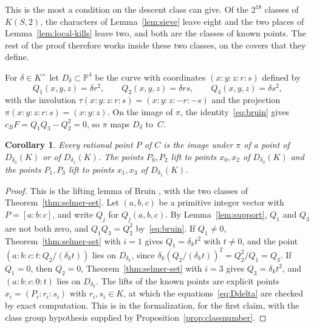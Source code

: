 \documentclass[11pt]{amsart}
\newtheorem{corollary}[theorem]{Corollary}
\theoremstyle{definition}
\numberwithin{equation}{section}
\newcommand{\lean}[1]{\ignorespaces}
\begin{document}
This is the most a condition on the descent class can give. Of the $2^{18}$ classes of $K(S,2)$, the characters of Lemma~\ref{lem:sieve} leave eight and the two places of Lemma~\ref{lem:local-kills} leave two, and both are the classes of known points. The rest of the proof therefore works inside these two classes, on the covers that they define.

For $\delta\in K^\times$ let $D_\delta\subset\mathbb P^4$ be the curve with coordinates $(x:y:z:r:s)$ defined by
\begin{equation}\label{eq:Ddelta}
Q_1(x,y,z)=\delta r^2,\qquad Q_2(x,y,z)=\delta rs,\qquad Q_3(x,y,z)=\delta s^2,
\end{equation}
with the involution $\tau(x:y:z:r:s)=(x:y:z:-r:-s)$ and the projection $\pi(x:y:z:r:s)=(x:y:z)$. On the image of $\pi$, the identity~\eqref{eq:bruin} gives $c_BF=Q_1Q_3-Q_2^2=0$, so $\pi$ maps $D_\delta$ to~$C$.

\begin{corollary}\label{cor:lift}\lean{FurioLombardo.M1.descent_Mmat, FurioLombardo.M3a.DPoint.p, FurioLombardo.M2.Proved.clK21TwoTorsionTrivial, FurioLombardo.Discharge.M3a.Bruin.x0, FurioLombardo.Discharge.M3a.Bruin.x1, FurioLombardo.Discharge.M3a.Bruin.x2, FurioLombardo.Discharge.M3a.Bruin.x3}
Every rational point $P$ of $C$ is the image under $\pi$ of a point of $D_{\delta_0}(K)$ or of $D_{\delta_1}(K)$. The points $P_0,P_2$ lift to points $x_0,x_2$ of $D_{\delta_0}(K)$ and the points $P_1,P_3$ lift to points $x_1,x_3$ of $D_{\delta_1}(K)$.
\end{corollary}

\begin{proof}
This is the lifting lemma of Bruin \cite[Lemma~8.1]{Bruin08}, with the two classes of Theorem~\ref{thm:selmer-set}. Let $(a,b,c)$ be a primitive integer vector with $P=[a:b:c]$, and write $Q_j$ for $Q_j(a,b,c)$. By Lemma~\ref{lem:support}, $Q_1$ and $Q_3$ are not both zero, and $Q_1Q_3=Q_2^2$ by~\eqref{eq:bruin}. If $Q_1\neq0$, Theorem~\ref{thm:selmer-set} with $i=1$ gives $Q_1=\delta_kt^2$ with $t\neq0$, and the point $(a:b:c:t:Q_2/(\delta_kt))$ lies on $D_{\delta_k}$, since $\delta_k(Q_2/(\delta_kt))^2=Q_2^2/Q_1=Q_3$. If $Q_1=0$, then $Q_2=0$, Theorem~\ref{thm:selmer-set} with $i=3$ gives $Q_3=\delta_kt^2$, and $(a:b:c:0:t)$ lies on $D_{\delta_k}$. The lifts of the known points are explicit points $x_i=(P_i:r_i:s_i)$ with $r_i,s_i\in K$, at which the equations~\eqref{eq:Ddelta} are checked by exact computation. This is  in the formalization, for the first claim, with the class group hypothesis supplied by Proposition~\ref{prop:classnumber}.
\end{proof}
\end{document}
